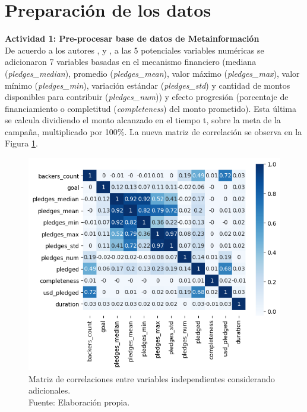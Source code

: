 \section{Preparación de los datos}
\textbf{Actividad 1: Pre-procesar base de datos de Metainformación}
\\
De acuerdo a los autores \cite{pr_chen2013kickpredict}, \cite{pr_chen2015predcrowd} y \cite{pr_jin2019dayssuccess}, a las 5 potenciales variables numéricas se adicionaron 7 variables basadas en el mecanismo financiero (mediana (\textit{pledges\_median}), promedio (\textit{pledges\_mean}), valor máximo (\textit{pledges\_max}), valor mínimo (\textit{pledges\_min}), variación estándar (\textit{pledges\_std}) y cantidad de montos disponibles para contribuir (\textit{pledges\_num})) y efecto progresión (porcentaje de financiamiento o completitud (\textit{completeness}) del monto prometido). Esta última se calcula dividiendo el monto alcanzado en el tiempo t, sobre la meta de la campaña, multiplicado por 100\%. La nueva matriz de correlación se observa en la Figura \ref{4:fig23}.

\begin{figure}[!ht]
	\begin{center}
		\includegraphics[width=1.00\textwidth]{4/figures/metadata correlation v2.png}
		\caption[Matriz de correlaciones entre variables independientes considerando adicionales]{Matriz de correlaciones entre variables independientes considerando adicionales.\\
			Fuente: Elaboración propia.}
		\label{4:fig23}
	\end{center}
\end{figure}

